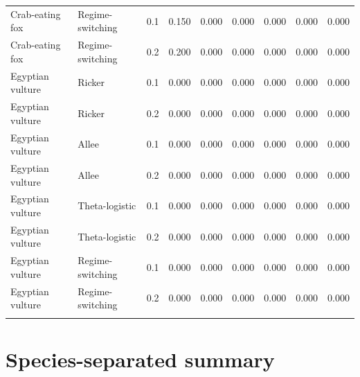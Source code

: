 \documentclass[10pt]{article}
\begin{document}
\begin{landscape}
\begin{center}
\begin{longtable}{@{}llc*{6}{r}@{}}
Crab-eating fox & Regime-switching & 0.1 & 0.150 & 0.000 & 0.000 & 0.000 & 0.000 & 0.000 \\
Crab-eating fox & Regime-switching & 0.2 & 0.200 & 0.000 & 0.000 & 0.000 & 0.000 & 0.000 \\
\addlinespace[2pt]
Egyptian vulture & Ricker & 0.1 & 0.000 & 0.000 & 0.000 & 0.000 & 0.000 & 0.000 \\
Egyptian vulture & Ricker & 0.2 & 0.000 & 0.000 & 0.000 & 0.000 & 0.000 & 0.000 \\
Egyptian vulture & Allee & 0.1 & 0.000 & 0.000 & 0.000 & 0.000 & 0.000 & 0.000 \\
Egyptian vulture & Allee & 0.2 & 0.000 & 0.000 & 0.000 & 0.000 & 0.000 & 0.000 \\
Egyptian vulture & Theta-logistic & 0.1 & 0.000 & 0.000 & 0.000 & 0.000 & 0.000 & 0.000 \\
Egyptian vulture & Theta-logistic & 0.2 & 0.000 & 0.000 & 0.000 & 0.000 & 0.000 & 0.000 \\
Egyptian vulture & Regime-switching & 0.1 & 0.000 & 0.000 & 0.000 & 0.000 & 0.000 & 0.000 \\
Egyptian vulture & Regime-switching & 0.2 & 0.000 & 0.000 & 0.000 & 0.000 & 0.000 & 0.000 \\
\addlinespace[2pt]
\end{longtable}
\end{center}
\end{landscape}

\section{Species-separated summary}
\end{document}

